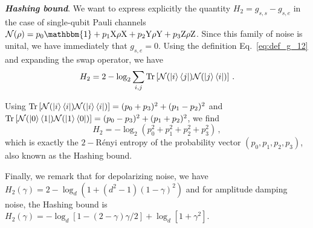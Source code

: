 \documentclass[aps,prl,twocolumn,superscriptaddress,numerical]{revtex4-2}
\newcommand{\Noise}{\mathcal{N}}
\newcommand{\idp}{e} %
\newcommand{\swp}{s} %
\newcommand{\Id}{\mathbbm{1}}
\newcommand{\PauliX}{{\text{X}}}
\newcommand{\PauliY}{{\text{Y}}}
\newcommand{\PauliZ}{{\text{Z}}}
\renewcommand{\section}[1]{\textbf{\emph{#1}}.\!}
\begin{document}
\section{Hashing bound} 
We want to express explicitly the quantity $H_2=g_{\swp,\swp}-g_{\swp,\idp}$ in the case of single-qubit Pauli channels $\Noise(\rho) = p_0 \Id + p_1 \PauliX \rho \PauliX + p_2 \PauliY \rho \PauliY + p_3 \PauliZ \rho \PauliZ$. Since this family of noise is unital, we have immediately that $g_{\swp,\idp}=0$. Using the definition Eq.~\eqref{eq:def_g_12} and expanding the swap operator, we have 
\begin{equation}
    H_2=2-\log_2 \sum_{i,j}\Tr\left[\Noise(\ket{i}\bra{j})\Noise(\ket{j}\bra{i})\right]\,.
\end{equation}

Using $\Tr\left[\Noise(\ket{i}\bra{i})\Noise(\ket{i}\bra{i})\right]=(p_0+p_3)^2+(p_1-p_2)^2$ and $\Tr\left[\Noise(\ket{0}\bra{1})\Noise(\ket{1}\bra{0})\right]=(p_0-p_3)^2+(p_1+p_2)^2$, we find
\begin{equation}
    H_2=-\log_2(p_0^2+p_1^2+p_2^2+p_3^2)\,,
\end{equation}
which is exactly the $2-$Rényi entropy of the probability vector $(p_0, p_1, p_2, p_3)$, also known as the Hashing bound.
 
Finally, we remark that for depolarizing noise, we have $H_2(\gamma)=2-\log_d(1+(d^2-1)(1-\gamma)^2)$ and for amplitude damping noise, the Hashing bound is $H_2(\gamma)=-\log_d\left[1-(2-\gamma)\gamma/2\right]+\log_d\left[1+\gamma^2\right]$.
\end{document}
